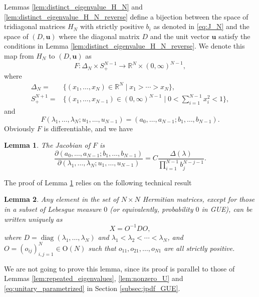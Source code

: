 \documentclass[11pt, a4paper]{article}
\numberwithin{equation}{section}
\newcommand{\realR}{\mathbb{R}}
\newcommand{\Orthogonal}{\mathrm{O}}
\renewcommand{\vec}[1]{\mathbf{#1}}
\DeclareMathOperator{\diag}{diag}
\newtheorem{lem}{Lemma}
\theoremstyle{definition}
\theoremstyle{remark}
\begin{document}
Lemmas \ref{lem:distinct_eigenvalue_H_N} and \ref{lem:distinct_eigenvalue_H_N_reverse} define a bijection between the space of tridiagonal matrices $H_N$ with strictly positive $b_i$ as denoted in \eqref{eq:J_N} and the space of $(D, \vec{u})$ where the diagonal matrix $D$ and the unit vector $\vec{u}$ satisfy the conditions in Lemma \ref{lem:distinct_eigenvalue_H_N_reverse}. We denote this map from $H_N$ to $(D, \vec{u})$ as
\begin{equation}
  F: \Delta_N \times S^{N - 1}_+ \to \realR^N \times (0, \infty)^{N - 1},
\end{equation}
where
\begin{align}
  \Delta_N = {}& \{ (x_1, \dotsc, x_N) \in \realR^N \mid x_1 > \dotsb > x_N \}, \\
  S^{N + 1}_+ = {}& \{(x_1, \dotsc, x_{N - 1}) \in (0, \infty)^{N - 1} \mid 0 < \sum^{N - 1}_{i = 1} x^2_i < 1 \},
\end{align}
and
\begin{equation}
  F(\lambda_1, \dotsc, \lambda_N; u_1, \dotsc, u_{N - 1}) = (a_0, \dotsc, a_{N - 1}; b_1, \dotsc, b_{N - 1}).
\end{equation}
Obviously $F$ is differentiable, and we have
\begin{lem} \label{lem:beta_Jacobian}
  The Jacobian of $F$ is
  \begin{equation} \label{eq:beta_Jacobian}
    \frac{\partial(a_0, \dotsc, a_{N - 1}; b_1, \dotsc, b_{N - 1})}{\partial(\lambda_1, \dotsc, \lambda_N; u_1, \dotsc, u_{N - 1})} = C \frac{\Delta(\lambda)}{\prod^{N - 1}_{i = 1} b^{N - j - 1}_j}.
  \end{equation}
\end{lem}
The proof of Lemma \ref{lem:beta_Jacobian} relies on the following technical result
\begin{lem}
  Any element in the set of $N \times N$ Hermitian matrices, except for those in a subset of Lebesgue measure $0$ (or equivalently, probability $0$ in GUE), can be written uniquely as
  \begin{equation} \label{eq:decompose_real_ortho}
    X = O^{-1} D O,
  \end{equation}
  where $D = \diag(\lambda_1, \dotsc, \lambda_N)$ and $\lambda_1 < \lambda_2 < \dotsb < \lambda_N$, and $O = (o_{ij})^N_{i, j = 1} \in \Orthogonal(N)$ such that $o_{11}, o_{21}, \dotsc, o_{N1}$ are all strictly positive.
\end{lem}
We are not going to prove this lemma, since its proof is parallel to those of Lemmas \ref{lem:repeated_eigenvalues}, \ref{lem:nonzero_U} and \ref{eq:unitary_parametrized} in Section \ref{subsec:jpdf_GUE}.
\end{document}
